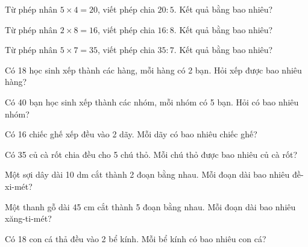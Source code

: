 \begin{ex}
Từ phép nhân $5 \times 4 = 20$, viết phép chia $20 : 5$. Kết quả bằng bao nhiêu?
\end{ex}

\begin{ex}
Từ phép nhân $2 \times 8 = 16$, viết phép chia $16 : 8$. Kết quả bằng bao nhiêu?
\end{ex}

\begin{ex}
Từ phép nhân $5 \times 7 = 35$, viết phép chia $35 : 7$. Kết quả bằng bao nhiêu?
\end{ex}

\begin{ex}
Có 18 học sinh xếp thành các hàng, mỗi hàng có 2 bạn. Hỏi xếp được bao nhiêu hàng?
\end{ex}

\begin{ex}
Có 40 bạn học sinh xếp thành các nhóm, mỗi nhóm có 5 bạn. Hỏi có bao nhiêu nhóm?
\end{ex}

\begin{ex}
Có 16 chiếc ghế xếp đều vào 2 dãy. Mỗi dãy có bao nhiêu chiếc ghế?
\end{ex}

\begin{ex}
Có 35 củ cà rốt chia đều cho 5 chú thỏ. Mỗi chú thỏ được bao nhiêu củ cà rốt?
\end{ex}

\begin{ex}
Một sợi dây dài 10 dm cắt thành 2 đoạn bằng nhau. Mỗi đoạn dài bao nhiêu đề-xi-mét?
\end{ex}

\begin{ex}
Một thanh gỗ dài 45 cm cắt thành 5 đoạn bằng nhau. Mỗi đoạn dài bao nhiêu xăng-ti-mét?
\end{ex}

\begin{ex}
Có 18 con cá thả đều vào 2 bể kính. Mỗi bể kính có bao nhiêu con cá?
\end{ex}

